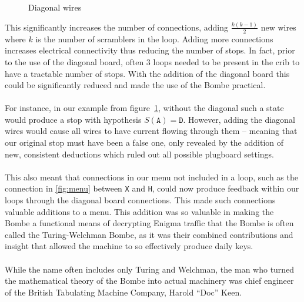 \begin{figure}[H]
\begin{center}
	\end{center}
	\caption{Diagonal wires}
	\label{fig:diagonal}
\end{figure}
\noindent This significantly increases the number of connections,
adding $\frac{k(k-1)}{2}$ new wires where $k$ is the number of
scramblers in the loop. Adding more connections increases electrical
connectivity thus reducing the number of stops. In fact, prior to the
use of the diagonal board, often $3$ loops needed to be present in
the crib to have a tractable number of stops. With the addition of
the diagonal board this could be significantly reduced and made the
use of the Bombe practical.
\\\\For instance, in our example from figure~\ref{fig:diagonal},
without the diagonal such a state would produce a stop with
hypothesis $S(\texttt{A}) = \texttt{D}$. However, adding the diagonal
wires would cause all wires to have current flowing through them --
meaning that our original stop must have been a false one, only
revealed by the addition of new, consistent deductions which ruled
out all possible plugboard settings.
\\\\This also meant that connections in our menu not included in a
loop, such as the connection in \ref{fig:menu} between \texttt{X} and
\texttt{H}, could now produce feedback within our loops through the
diagonal board connections. This made such connections valuable
additions to a menu. This addition was so valuable in making the Bombe a functional means of decrypting Enigma traffic that the Bombe is often called the Turing-Welchman Bombe, as it was their combined contributions and insight that allowed the machine to so effectively produce daily keys.
\\\\While the name often includes only Turing and Welchman, the man who turned the mathematical theory of the Bombe into actual machinery was chief engineer of the British Tabulating Machine Company, Harold ``Doc'' Keen.

